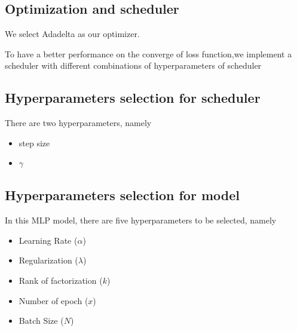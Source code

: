 \documentclass[final]{cvpr}
\begin{document}



\subsection{Optimization and scheduler}
We select Adadelta as our optimizer. 

To have a better performance on the converge of loss function,we implement a scheduler with different combinations of hyperparameters of scheduler
\subsection{Hyperparameters selection for scheduler}
There are two hyperparameters, namely
\begin{itemize}
    \item step size
    \item $\gamma$
\end{itemize}

\subsection{Hyperparameters selection for model}
In this MLP model, there are five hyperparameters to be selected, namely
\begin{itemize}
	\item Learning Rate ($\alpha$)
	\item Regularization ($\lambda$)
	\item Rank of factorization ($k$)
	\item Number of epoch ($x$)
	\item Batch Size ($N$)
\end{itemize}
\end{document}
